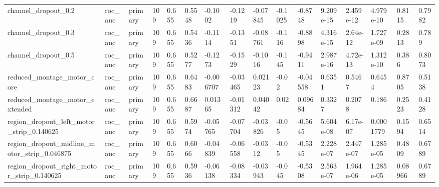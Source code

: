 \begin{tabular}{llllllllllllllll}
channel\_dropout\_0.2 & roc\_auc & primary & 109 & 0.655 & 0.5548 & -0.1002 & -0.1219 & -0.07845 & -0.1025 & -0.8748 & 9.209e-15 & 2.459e-12 & 4.979e-10 & 0.8115 & 0.7982 \\
channel\_dropout\_0.3 & roc\_auc & primary & 109 & 0.655 & 0.5436 & -0.1114 & -0.1351 & -0.08761 & -0.116 & -0.8898 & 4.316e-15 & 2.64e-12 & 1.727e-09 & 0.2813 & 0.789 \\
channel\_dropout\_0.5 & roc\_auc & primary & 109 & 0.655 & 0.5277 & -0.1273 & -0.1529 & -0.1016 & -0.145 & -0.9411 & 2.987e-16 & 4.72e-13 & 1.312e-10 & 0.386 & 0.8073 \\
reduced\_montage\_motor\_core & roc\_auc & primary & 109 & 0.655 & 0.6483 & -0.006707 & -0.03465 & 0.02123 & -0.02 & -0.04558 & 0.6351 & 0.5467 & 0.6454 & 0.8705 & 0.5138 \\
reduced\_montage\_motor\_extended & roc\_auc & primary & 109 & 0.655 & 0.6687 & 0.01365 & -0.01312 & 0.04042 & 0.02 & 0.09684 & 0.3327 & 0.2078 & 0.186 & 0.2523 & 0.4128 \\
region\_dropout\_left\_motor\_strip\_0.140625 & roc\_auc & primary & 109 & 0.655 & 0.5974 & -0.05765 & -0.07704 & -0.03826 & -0.05 & -0.5645 & 5.604e-08 & 6.17e-07 & 0.0001779 & 0.1594 & 0.6514 \\
region\_dropout\_midline\_motor\_strip\_0.046875 & roc\_auc & primary & 109 & 0.655 & 0.6066 & -0.04839 & -0.06558 & -0.0312 & -0.05 & -0.5345 & 2.228e-07 & 2.447e-07 & 1.285e-05 & 0.4809 & 0.6789 \\
region\_dropout\_right\_motor\_strip\_0.140625 & roc\_auc & primary & 109 & 0.655 & 0.5936 & -0.06138 & -0.08334 & -0.03943 & -0.045 & -0.5308 & 2.563e-07 & 1.964e-06 & 1.285e-05 & 0.08966 & 0.6789 \\
\bottomrule
\end{tabular}
